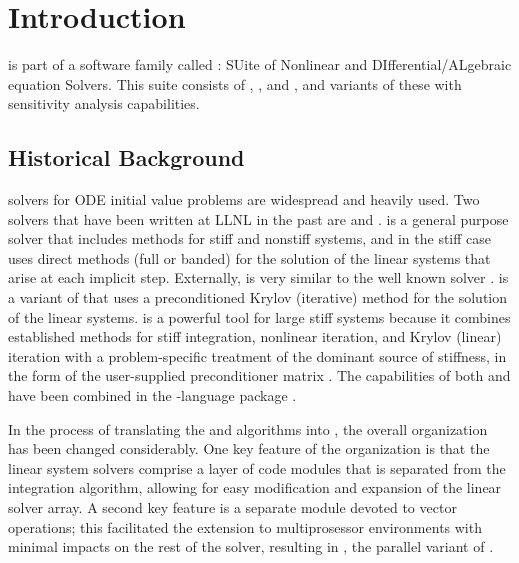 \chapter{Introduction}\label{s:intro}

{\cvode} is part of a software family called {\sundials}: 
SUite of Nonlinear and DIfferential/ALgebraic equation Solvers.  
This suite consists of {\cvode}, {\kinsol}, and {\ida}, and variants of these
with sensitivity analysis capabilities.
%
\section{Historical Background}\label{ss:history}

{\F} solvers for ODE initial value problems are widespread and heavily used. 
Two solvers that have been written at LLNL in the past are {\vode} \cite{BBH:89} 
and {\vodpk} \cite{Byr:92}.
{\vode} is a general purpose solver that includes methods for stiff
and nonstiff systems, and in the stiff case uses direct methods (full or
banded) for the solution of the linear systems that arise at each implicit
step. Externally, {\vode} is very similar to the well known solver
{\lsode} \cite{RaHi:94}.
{\vodpk} is a variant of {\vode} that uses a preconditioned Krylov 
(iterative) method for the solution of the linear systems. {\vodpk} is a powerful 
tool for large stiff systems because it combines established methods for stiff 
integration, nonlinear iteration, and Krylov (linear) iteration with a problem-specific
treatment of the dominant source of stiffness, in the form of the user-supplied
preconditioner matrix \cite{BrHi:89}.
The capabilities of both {\vode} and {\vodpk} have been combined in the {\C}-language 
package {\cvode} \cite{CoHi:96}.

In the process of translating the {\vode} and {\vodpk} algorithms into {\C}, the overall 
{\cvode} organization has been changed considerably.
One key feature of the {\cvode} organization is that the linear system solvers comprise a
layer of code modules that is separated from the integration algorithm, allowing for 
easy modification and expansion of the linear solver array.
A second key feature is a separate module devoted to vector operations; this 
facilitated the extension to multiprosessor environments with minimal impacts 
on the rest of the solver, resulting in {\pvode} \cite{ByHi:99}, 
the parallel variant of {\cvode}.

